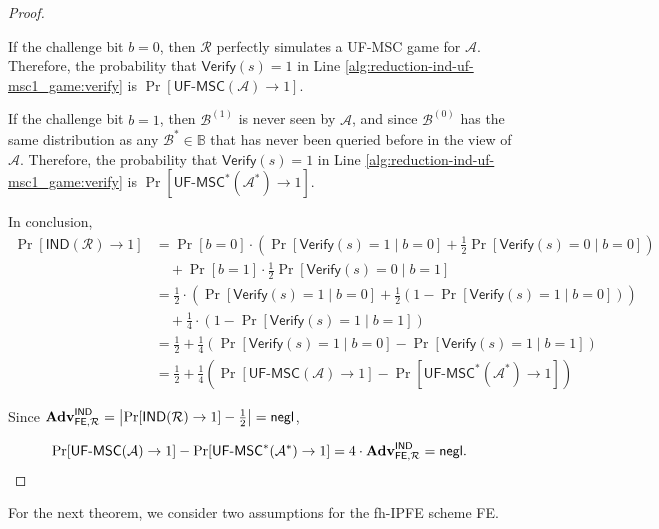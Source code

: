 \begin{proof}
\begin{figure}[h]
\label{fig:reduction-ind-uf-msc1_game}
\end{figure}

If the challenge bit $b = 0$, then $\mathcal{R}$ perfectly simulates a \textsf{UF-MSC} game for $\mathcal{A}$. Therefore, the probability that $\textsf{Verify}(s) = 1$ in Line \ref{alg:reduction-ind-uf-msc1_game:verify} is $\Pr[\textsf{UF-MSC}(\mathcal{A}) \to 1]$.

If the challenge bit $b = 1$, then $\mathcal{B}^{(1)}$ is never seen by $\mathcal{A}$, and since $\mathcal{B}^{(0)}$ has the same distribution as any $\mathcal{B}^* \in \mathbb{B}$ that has never been queried before in the view of $\mathcal{A}$. Therefore, the probability that $\textsf{Verify}(s) = 1$ in Line \ref{alg:reduction-ind-uf-msc1_game:verify} is $\Pr[ \textsf{UF-MSC}^*(\mathcal{A}^*) \to 1 ]$.

In conclusion,
\begin{align*}
	\Pr[\textsf{IND}(\mathcal{R}) \to 1]
	&= \Pr[b = 0] \cdot \left( \Pr[\textsf{Verify}(s) = 1 \mid b = 0] + \frac{1}{2} \Pr[\textsf{Verify}(s) = 0 \mid b = 0] \right)  \\
	&\quad + \Pr[b = 1] \cdot \frac{1}{2} \Pr[\textsf{Verify}(s) = 0 \mid b = 1] \\
	&= \frac{1}{2} \cdot \left ( \Pr[\textsf{Verify}(s) = 1 \mid b = 0] + \frac{1}{2} (1 - \Pr[\textsf{Verify}(s) = 1 \mid b = 0]) \right) \\
	& \quad +  \frac{1}{4} \cdot (1 - \Pr[\textsf{Verify}(s) = 1 \mid b = 1]) \\
	&= \frac{1}{2} + \frac{1}{4} \left( \Pr[\textsf{Verify}(s) = 1 \mid b = 0] - \Pr[\textsf{Verify}(s) = 1 \mid b = 1] \right) \\
	&= \frac{1}{2} + \frac{1}{4} \left( \Pr[\textsf{UF-MSC}(\mathcal{A}) \to 1] - \Pr[ \textsf{UF-MSC}^*(\mathcal{A}^*) \to 1 ] \right)
\end{align*}

\noindent Since $\mathbf{Adv}_{\textsf{FE}, \mathcal{R}}^\textsf{IND} = \left| \Pr[\textsf{IND}(\mathcal{R}) \to 1 ] - \frac{1}{2} \right| = \mathsf{negl}$,

\[
	\Pr[\textsf{UF-MSC}(\mathcal{A}) \to 1] - \Pr[ \textsf{UF-MSC}^*(\mathcal{A}^*) \to 1 ] = 4 \cdot \mathbf{Adv}_{\textsf{FE}, \mathcal{R}}^\textsf{IND} = \mathsf{negl}.
\]

\end{proof}

For the next theorem, we consider two assumptions for the fh-IPFE scheme \textsf{FE}.

